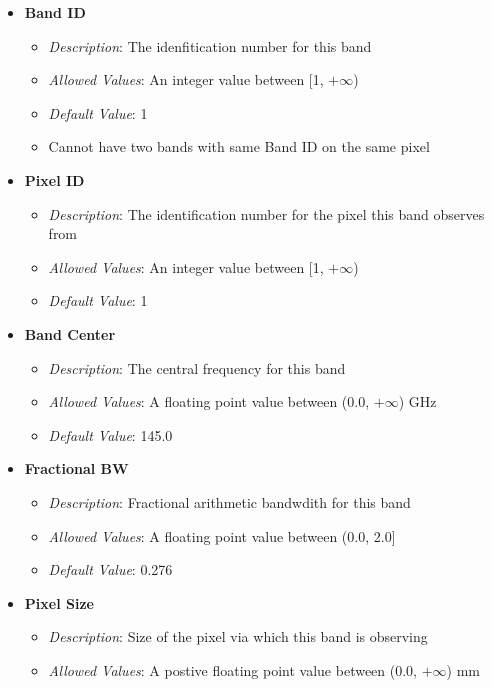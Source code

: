 \documentclass[11pt]{article} %
\begin{document}
\begin{itemize}[noitemsep,topsep=0pt]
	\item \textbf{Band ID}
		\begin{itemize}[noitemsep,topsep=0pt]
		\item \textit{Description}: The idenfitication number for this band 
		\item \textit{Allowed Values}: An integer value between [1, $+\infty$)
		\item \textit{Default Value}: 1
		\item Cannot have two bands with same Band ID on the same pixel
		\end{itemize}
	\item \textbf{Pixel ID}
		\begin{itemize}[noitemsep,topsep=0pt]
		\item \textit{Description}: The identification number for the pixel this band observes from
		\item \textit{Allowed Values}: An integer value between [1, $+\infty$)
		\item \textit{Default Value}: 1
		\end{itemize}
	\item \textbf{Band Center}
		\begin{itemize}[noitemsep,topsep=0pt]
		\item \textit{Description}: The central frequency for this band 
		\item \textit{Allowed Values}: A floating point value between (0.0, $+\infty$) GHz
		\item \textit{Default Value}: 145.0
		\end{itemize}
	\item \textbf{Fractional BW}
		\begin{itemize}[noitemsep,topsep=0pt]
		\item \textit{Description}: Fractional arithmetic bandwdith for this band 
		\item \textit{Allowed Values}: A floating point value between (0.0, 2.0]
		\item \textit{Default Value}: 0.276
		\end{itemize}
	\item \textbf{Pixel Size}
		\begin{itemize}[noitemsep,topsep=0pt]
		\item \textit{Description}: Size of the pixel via which this band is observing 
		\item \textit{Allowed Values}: A postive floating point value between (0.0, $+\infty$) mm

\end{itemize}
\end{itemize}
\end{document}
